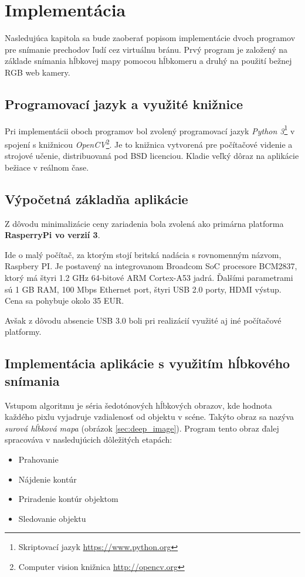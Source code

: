 \chapter{Implementácia}

Nasledujúca kapitola sa bude zaoberať popisom implementácie dvoch programov pre snímanie prechodov ľudí cez virtuálnu bránu. Prvý program je založený na základe snímania hĺbkovej mapy pomocou hĺbkomeru a druhý na použití bežnej RGB web kamery.

\section{Programovací jazyk a využité knižnice}
Pri implementácii oboch programov bol zvolený programovací jazyk \textit{Python 3}\footnote{Skriptovací jazyk \url{https://www.python.org}} v spojení s knižnicou \textit{OpenCV}\footnote{Computer vision knižnica  \url{http://opencv.org}}. Je to knižnica vytvorená pre počítačové videnie a strojové učenie, distribuovaná pod BSD licenciou. Kladie veľký dôraz na aplikácie bežiace v reálnom čase. 

\section{Výpočetná základňa aplikácie}
Z dôvodu minimalizácie ceny zariadenia bola zvolená ako primárna platforma \textbf{RasperryPi vo verzií 3}. 

Ide o malý počítač, za ktorým stojí britská nadácia s rovnomenným názvom, Raspbery PI. Je postavený na  integrovanom Broadcom SoC procesore BCM2837, ktorý má štyri 1.2 GHz 64-bitové ARM Cortex-A53 jadrá. Ďalšími parametrami sú 1 GB RAM, 100 Mbps Ethernet port, štyri USB 2.0 porty, HDMI výstup. Cena sa pohybuje okolo 35 EUR.

Avšak z dôvodu absencie USB 3.0 boli pri realizácií využité aj iné počítačové platformy.

\section{Implementácia aplikácie s využitím hĺbkového snímania}
Vstupom algoritmu je séria šedotónových hĺbkových obrazov, kde hodnota každého pixlu vyjadruje vzdialenosť od objektu v scéne. Takýto obraz sa nazýva \textit{surová hĺbková mapa} (obrázok \ref{sec:deep_image}). Program tento obraz ďalej spracováva v nasledujúcich dôležitých etapách: 

\begin{itemize}
\item Prahovanie
\item Nájdenie kontúr
\item Priradenie kontúr objektom
\item Sledovanie objektu 
\end{itemize}


